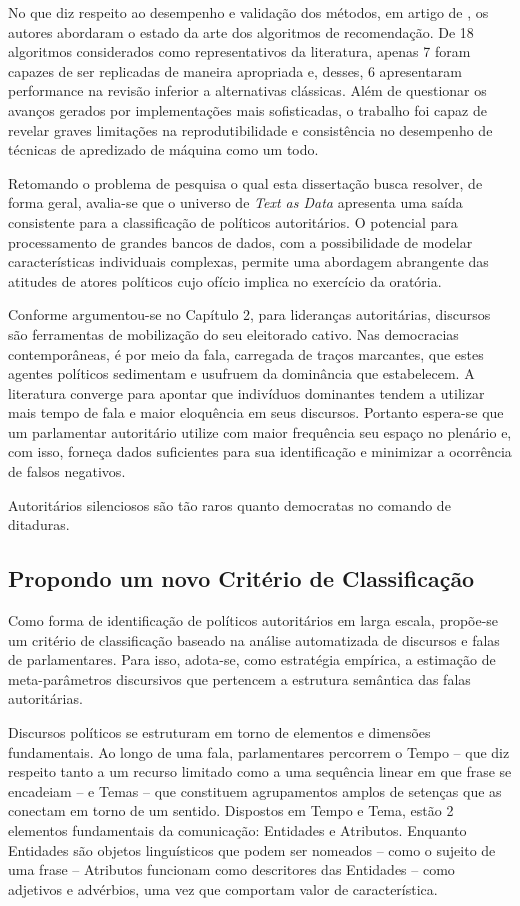 \documentclass[
12pt,				%
openright,			%
twoside,			%
a4paper,			%
english,			%
french,				%
spanish,			%
brazil				%
]{abntex2}
\begin{document}
No que diz respeito ao desempenho e validação dos métodos, em artigo de , os autores abordaram o estado da arte dos algoritmos de recomendação. De 18 algoritmos considerados como representativos da literatura, apenas 7 foram capazes de ser replicadas de maneira apropriada e, desses, 6 apresentaram performance na revisão inferior a alternativas clássicas. Além de questionar os avanços gerados por implementações mais sofisticadas, o trabalho foi capaz de revelar graves limitações na reprodutibilidade e consistência no desempenho de técnicas de apredizado de máquina como um todo.  

Retomando o problema de pesquisa o qual esta dissertação busca resolver, de forma geral, avalia-se que o universo de \emph{Text as Data} apresenta uma saída consistente para a classificação de políticos autoritários. O potencial para processamento de grandes bancos de dados, com a possibilidade de modelar características individuais complexas, permite uma abordagem abrangente das atitudes de atores políticos cujo ofício implica no exercício da oratória.

Conforme argumentou-se no Capítulo 2, para lideranças autoritárias, discursos são ferramentas de mobilização do seu eleitorado cativo. Nas democracias contemporâneas, é por meio da fala, carregada de traços marcantes, que estes agentes políticos sedimentam e usufruem da dominância que estabelecem. A literatura converge para apontar que indivíduos dominantes tendem a utilizar mais tempo de fala e maior eloquência em seus discursos. Portanto espera-se que um parlamentar autoritário utilize com maior frequência seu espaço no plenário e, com isso, forneça dados suficientes para sua identificação e minimizar a ocorrência de falsos negativos. 

Autoritários silenciosos são tão raros quanto democratas no comando de ditaduras. 

\subsection{Propondo um novo Critério de Classificação}

Como forma de identificação de políticos autoritários em larga escala, propõe-se um critério de classificação baseado na análise automatizada de discursos e falas de parlamentares. Para isso, adota-se, como estratégia empírica, a estimação de meta-parâmetros discursivos que pertencem a estrutura semântica das falas autoritárias.

Discursos políticos se estruturam em torno de elementos e dimensões fundamentais. Ao longo de uma fala, parlamentares percorrem o Tempo -- que diz respeito tanto a um recurso limitado como a uma sequência linear em que frase se encadeiam -- e Temas -- que constituem agrupamentos amplos de setenças que as conectam em torno de um sentido. Dispostos em Tempo e Tema, estão 2 elementos fundamentais da comunicação: Entidades e Atributos. Enquanto Entidades são objetos linguísticos que podem ser nomeados -- como o sujeito de uma frase -- Atributos funcionam como descritores das Entidades -- como adjetivos e advérbios, uma vez que comportam valor de característica.
\end{document}
